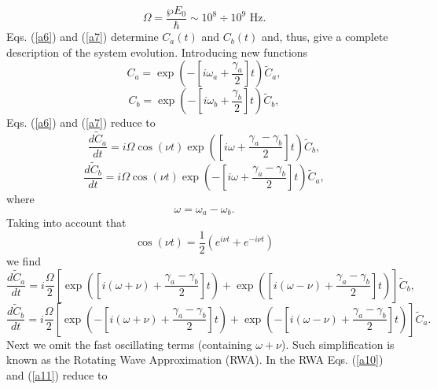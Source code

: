 \documentclass[preprint,preprintnumbers]{revtex4}
\begin{document}
\begin{equation*}
\Omega =\frac{\wp E_{0}}{\hbar }\sim 10^{8}\div 10^{9}\text{ Hz.}
\end{equation*}%
Eqs. (\ref{a6}) and (\ref{a7}) determine $C_{a}(t)$ and $C_{b}(t)$ and,
thus, give a complete description of the system evolution. Introducing new
functions%
\begin{equation}
C_{a}=\exp \left( -\left[ i\omega _{a}+\frac{\gamma _{a}}{2}\right] t\right)
\tilde{C}_{a},
\end{equation}%
\begin{equation}
C_{b}=\exp \left( -\left[ i\omega _{b}+\frac{\gamma _{b}}{2}\right] t\right)
\tilde{C}_{b},
\end{equation}%
Eqs. (\ref{a6}) and (\ref{a7}) reduce to
\begin{equation}
\frac{d\tilde{C}_{a}}{dt}=i\Omega \cos (\nu t)\exp \left( \left[ i\omega +%
\frac{\gamma _{a}-\gamma _{b}}{2}\right] t\right) \tilde{C}_{b},  \label{a8}
\end{equation}%
\begin{equation}
\frac{d\tilde{C}_{b}}{dt}=i\Omega \cos (\nu t)\exp \left( -\left[ i\omega +%
\frac{\gamma _{a}-\gamma _{b}}{2}\right] t\right) \tilde{C}_{a},  \label{a9}
\end{equation}%
where%
\begin{equation*}
\omega =\omega _{a}-\omega _{b}.
\end{equation*}%
Taking into account that
\begin{equation*}
\cos (\nu t)=\frac{1}{2}\left( e^{i\nu t}+e^{-i\nu t}\right)
\end{equation*}%
we find%
\begin{equation}
\frac{d\tilde{C}_{a}}{dt}=i\frac{\Omega }{2}\left[ \exp \left( \left[
i(\omega +\nu )+\frac{\gamma _{a}-\gamma _{b}}{2}\right] t\right) +\exp
\left( \left[ i(\omega -\nu )+\frac{\gamma _{a}-\gamma _{b}}{2}\right]
t\right) \right] \tilde{C}_{b},  \label{a10}
\end{equation}%
\begin{equation}
\frac{d\tilde{C}_{b}}{dt}=i\frac{\Omega }{2}\left[ \exp \left( -\left[
i(\omega +\nu )+\frac{\gamma _{a}-\gamma _{b}}{2}\right] t\right) +\exp
\left( -\left[ i(\omega -\nu )+\frac{\gamma _{a}-\gamma _{b}}{2}\right]
t\right) \right] \tilde{C}_{a}.  \label{a11}
\end{equation}%
Next we omit the fast oscillating terms (containing $\omega +\nu $). Such
simplification is known as the Rotating Wave Approximation (RWA). In the RWA
Eqs. (\ref{a10}) and (\ref{a11}) reduce to
\end{document}
